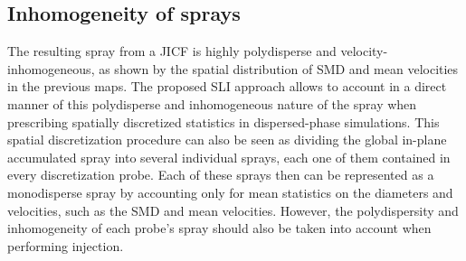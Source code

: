 \clearpage




\subsection{Inhomogeneity of sprays}

The resulting spray from a JICF is highly polydisperse and velocity-inhomogeneous, as shown by the spatial distribution of SMD and mean velocities in the previous maps. The proposed SLI approach allows to account in a direct manner of this polydisperse and inhomogeneous nature of the spray when prescribing spatially discretized statistics in dispersed-phase simulations. This spatial discretization procedure can also be seen as dividing the global in-plane accumulated spray into several individual sprays, each one of them contained in every discretization probe. Each of these sprays then can be represented as a monodisperse spray by accounting only for mean statistics on the diameters and velocities, such as the SMD and mean velocities. However, the polydispersity and inhomogeneity of each probe's spray should also be taken into account when performing injection.

